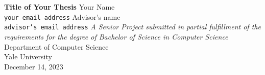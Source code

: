 \begin{titlepage}
\begin{center}
\vspace*{1cm}
\Large
\textbf{Title of Your Thesis}
\vspace{0.5cm}
\LARGE
\vspace{1 cm}
\large
Your Name \\\texttt{your email address}
\vspace{0.2cm}
\large
Advisor's name \\\texttt{advisor's email address}
\vfill
\textit{A Senior Project submitted in partial fulfillment of the
requirements for the degree of Bachelor of Science in Computer Science}
\vspace{0.4cm}
\large
Department of Computer Science \\
Yale University\\
December 14, 2023
\end{center}
\end{titlepage}
